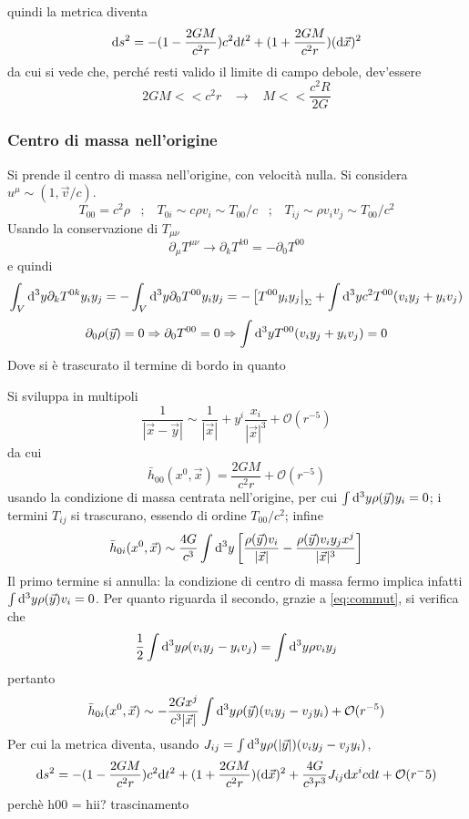 quindi la metrica diventa
\[ \mathrm{d} s^2 = -(1-\frac{2GM}{c^2r})c^2\mathrm{d} t^2 + (1+\frac{2GM}{c^2r})(\mathrm{d} \vec{x})^2 \]
da cui si vede che, perch\'e resti valido il limite di campo debole, dev'essere
\[ 2GM << c^2r \;\;\;\rightarrow \;\;\; M<<\frac{c^2R}{2G} \]




\subsubsection{Centro di massa nell'origine}
Si prende il centro di massa nell'origine, con velocit\`a nulla. Si considera \( u^\mu \sim (1,\vec{v}/c) \).
\[ T_{00} = c^2\rho \;\;\; ; \;\;\; T_{0i} \sim c\rho v_i \sim T_{00}/c \;\;\; ; \;\;\; T_{ij} \sim \rho v_i v_j\sim T_{00}/c^2 \]
Usando la conservazione di $T_{\mu\nu}$
\[ \partial_\mu T^{\mu\nu} \rightarrow \partial_k T^{k0} = - \partial_0 T^{00} \]
e quindi 
\[ \int_V \mathrm{d}^3y \partial_kT^{0k} y_iy_j = -\int_V \mathrm{d}^3y \partial_0T^{00} y_iy_j  = -\left[ T^{00}y_iy_j\right|_\Sigma + \int \mathrm{d}^3y c^2 T^{00} (v_iy_j + y_iv_j) \]
\begin{equation} \label{eq:commut}
	\partial_0\rho(\vec{y}) = 0 \Rightarrow \partial_0T^{00} = 0 \Rightarrow \int \mathrm{d}^3y T^{00} (v_iy_j + y_iv_j) =0 
\end{equation}
Dove si \`e trascurato il termine di bordo in quanto \todo

Si sviluppa in multipoli
\[ \frac{1}{|\vec{x}-\vec{y}|} \sim \frac{1}{|\vec{x}|} + y^i \frac{x_i}{|\vec{x}|^3} + \mathcal{O}(r^{-5}) \]
da cui
\[ \bar{h}_{00}(x^0,\vec{x}) = \frac{2GM}{c^2 r} + \mathcal{O}(r^{-5}) \]
usando la condizione di massa centrata nell'origine, per cui \( \int \mathrm{d}^3y\rho(\vec{y})y_i = 0\); i termini $T_{ij}$ si trascurano, essendo di ordine $T_{00}/c^2$; infine
\[ \bar{h}_{0i}(x^0,\vec{x}) \sim \frac{4G}{c^3} \int \mathrm{d}^3y 
	\left[ 
		\frac{\rho(\vec{y})v_i}{|\vec{x}|}     
	      - \frac{\rho(\vec{y})v_iy_j x^j}{|\vec{x}|^3} 
	\right] \] 
Il primo termine si annulla: la condizione di centro di massa fermo implica infatti \( \int \mathrm{d}^3y\rho(\vec{y})v_i = 0\). Per quanto riguarda il secondo, grazie a \ref{eq:commut}, si verifica che
\[ \frac{1}{2} \int \mathrm{d}^3y \rho (v_iy_j - y_iv_j) = \int \mathrm{d}^3y \rho v_iy_j \]
pertanto
\[ \bar{h}_{0i}(x^0,\vec{x}) \sim -\frac{2Gx^j}{c^3|\vec{x}|} \int \mathrm{d}^3y \rho(\vec{y}) (v_iy_j - v_jy_i) + \mathcal{O}(r^{-5})  \]
Per cui la metrica diventa, usando \( J_{ij} = \int \mathrm{d}^3y \rho(|\vec{y}|) (v_iy_j - v_jy_i) \),
\[ \mathrm{d} s^2 = -(1 - \frac{2GM}{c^2 r} ) c^2 \mathrm{d} t^2 + (1+\frac{2GM}{c^2 r} ) (\mathrm{d}\vec{x})^2 + \frac{4G}{c^3r^3}J_{ij}\mathrm{d} x^i c \mathrm{d} t + \mathcal{O}(r^-5) \]
\todo perch\`e h00 = hii? 
\todo trascinamento

